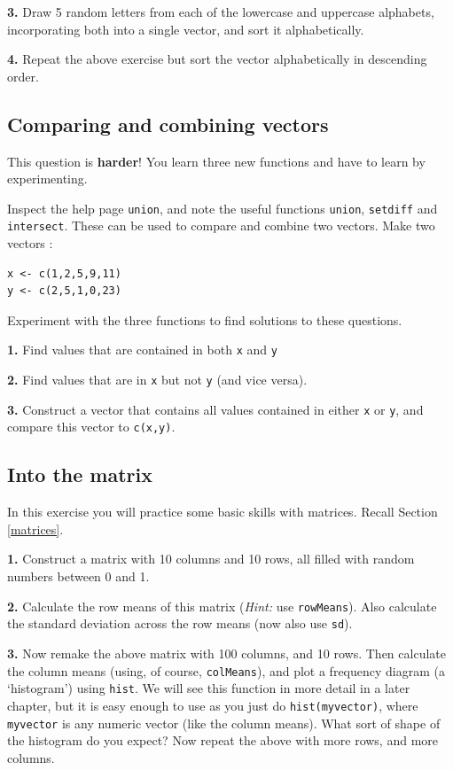 \documentclass[]{book}
\begin{document}
\textbf{3.} Draw 5 random letters from each of the lowercase and uppercase alphabets, incorporating both into a single vector, and sort it alphabetically.

\textbf{4.} Repeat the above exercise but sort the vector alphabetically in descending order.

\hypertarget{comparing-and-combining-vectors}{%
\subsection{Comparing and combining vectors}\label{comparing-and-combining-vectors}}

This question is \textbf{harder}! You learn three new functions and have to learn by experimenting.

Inspect the help page \texttt{union}, and note the useful functions \texttt{union}, \texttt{setdiff} and \texttt{intersect}. These can be used to compare and combine two vectors. Make two vectors :

\begin{verbatim}
x <- c(1,2,5,9,11)
y <- c(2,5,1,0,23)
\end{verbatim}

Experiment with the three functions to find solutions to these questions.

\textbf{1.} Find values that are contained in both \texttt{x} and \texttt{y}

\textbf{2.} Find values that are in \texttt{x} but not \texttt{y} (and vice versa).

\textbf{3.} Construct a vector that contains all values contained in either \texttt{x} or \texttt{y}, and compare this vector to \texttt{c(x,y)}.

\hypertarget{into-the-matrix}{%
\subsection{Into the matrix}\label{into-the-matrix}}

In this exercise you will practice some basic skills with matrices. Recall Section \ref{matrices}.

\textbf{1.} Construct a matrix with 10 columns and 10 rows, all filled with random numbers between 0 and 1.

\textbf{2.} Calculate the row means of this matrix (\emph{Hint:} use \texttt{rowMeans}). Also calculate the standard deviation across the row means (now also use \texttt{sd}).

\textbf{3.} Now remake the above matrix with 100 columns, and 10 rows. Then calculate the column means (using, of course, \texttt{colMeans}), and plot a frequency diagram (a `histogram') using \texttt{hist}. We will see this function in more detail in a later chapter, but it is easy enough to use as you just do \texttt{hist(myvector)}, where \texttt{myvector} is any numeric vector (like the column means). What sort of shape of the histogram do you expect? Now repeat the above with more rows, and more columns.
\end{document}
